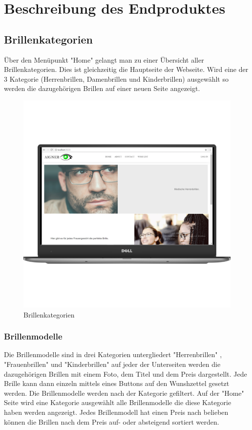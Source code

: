 \chapter{Beschreibung des Endproduktes}\label{cha:theoretical-background}
\pagebreak 
\section{Brillenkategorien}
Über den Menüpunkt "Home" gelangt man zu einer Übersicht aller Brillenkategorien. Dies ist gleichzeitig die Hauptseite der Webseite. Wird eine der 3 Kategorie (Herrenbrillen, Damenbrillen und Kinderbrillen) ausgewählt so werden die dazugehörigen Brillen auf einer neuen Seite angezeigt.

\begin{figure}[H]
\begin{center}
	\includegraphics[scale=.2]{images/Index.png}
\end{center}
	\caption{Brillenkategorien}
	\label{fig:sample}
\end{figure}
\pagebreak
\subsection{Brillenmodelle}
Die Brillenmodelle sind in drei Kategorien untergliedert "Herrenbrillen" , "Frauenbrillen" und "Kinderbrillen" auf jeder der Unterseiten werden die dazugehörigen Brillen mit einem Foto, dem Titel und dem Preis dargestellt. Jede Brille kann dann einzeln mittels eines Buttons auf den Wunshzettel gesetzt werden.
Die Brillenmodelle werden nach der Kategorie gefiltert. Auf der "Home" Seite wird eine Kategorie ausgewählt alle Brillenmodelle die diese Kategorie haben werden angezeigt.
Jedes Brillenmodell hat einen Preis nach belieben können die Brillen nach dem Preis auf- oder absteigend sortiert werden. 

